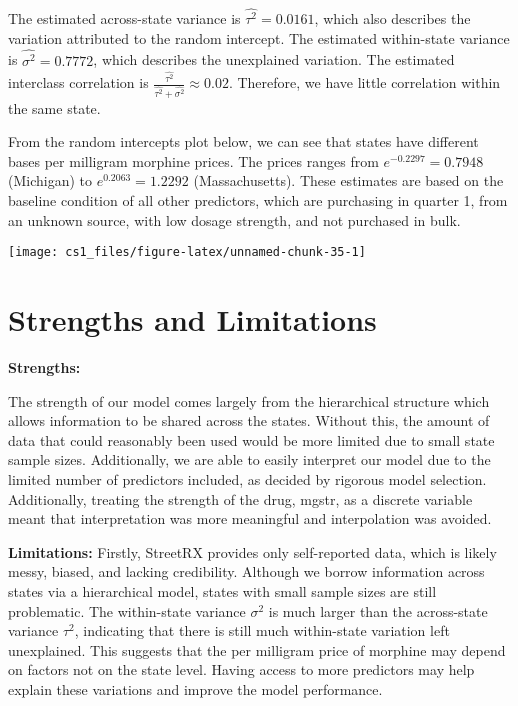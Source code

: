 \documentclass[
  11pt,
]{article}
\begin{document}
The estimated across-state variance is \(\hat{\tau^2} = 0.0161\), which
also describes the variation attributed to the random intercept. The
estimated within-state variance is \(\hat{\sigma^2} = 0.7772\), which
describes the unexplained variation. The estimated interclass
correlation is
\(\frac{\hat{\tau^2}}{\hat{\tau^2} + \hat{\sigma^2}} \approx 0.02\).
Therefore, we have little correlation within the same state.

From the random intercepts plot below, we can see that states have
different bases per milligram morphine prices. The prices ranges from
\(e^{-0.2297} = 0.7948\) (Michigan) to \(e^{0.2063} = 1.2292\)
(Massachusetts). These estimates are based on the baseline condition of
all other predictors, which are purchasing in quarter 1, from an unknown
source, with low dosage strength, and not purchased in bulk.

\begin{center}\texttt{[image: cs1\_files/figure-latex/unnamed-chunk-35-1]} \end{center}

\hypertarget{strengths-and-limitations}{%
\section{Strengths and Limitations}\label{strengths-and-limitations}}

\textbf{Strengths:}

The strength of our model comes largely from the hierarchical structure
which allows information to be shared across the states. Without this,
the amount of data that could reasonably been used would be more limited
due to small state sample sizes. Additionally, we are able to easily
interpret our model due to the limited number of predictors included, as
decided by rigorous model selection. Additionally, treating the strength
of the drug, mgstr, as a discrete variable meant that interpretation was
more meaningful and interpolation was avoided.

\textbf{Limitations:} Firstly, StreetRX provides only self-reported
data, which is likely messy, biased, and lacking credibility. Although
we borrow information across states via a hierarchical model, states
with small sample sizes are still problematic. The within-state variance
\(\sigma^2\) is much larger than the across-state variance \(\tau^2\),
indicating that there is still much within-state variation left
unexplained. This suggests that the per milligram price of morphine may
depend on factors not on the state level. Having access to more
predictors may help explain these variations and improve the model
performance.
\end{document}
